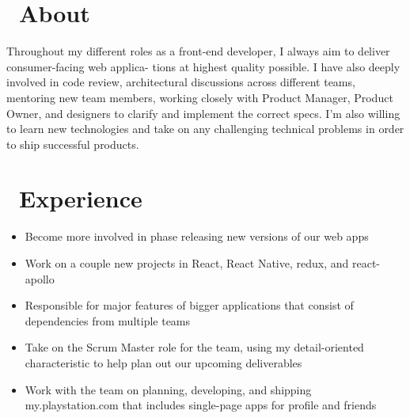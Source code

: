 \documentclass{resume}
\begin{document}



\section{\faInfo\ About}
Throughout my different roles as a front-end developer, I always aim to deliver consumer-facing web applica- tions at highest quality possible. I have also deeply involved in code review, architectural discussions across different teams, mentoring new team members, working closely with Product Manager, Product Owner, and designers to clarify and implement the correct specs. I’m also willing to learn new technologies and take on any challenging technical problems in order to ship successful products.

\section{\faUsers\ Experience}
\begin{itemize}
  \item Become more involved in phase releasing new versions of our web apps
  \item Work on a couple new projects in React, React Native, redux, and react-apollo
  \item Responsible for major features of bigger applications that consist of dependencies from multiple teams
\end{itemize}

\begin{itemize}
  \item Take on the Scrum Master role for the team, using my detail-oriented characteristic to help plan out our upcoming deliverables
  \item Work with the team on planning, developing, and shipping my.playstation.com that includes single-page apps for profile and friends
\end{itemize}
\end{document}
